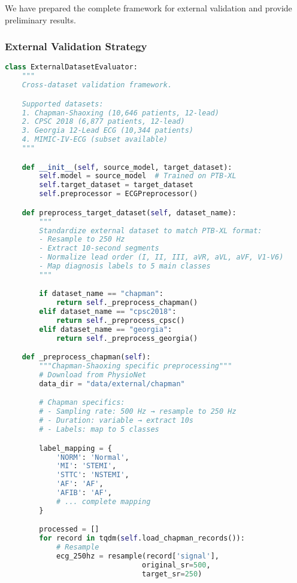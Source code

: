 \documentclass[11pt]{article}
\begin{document}
We have prepared the complete framework for external validation and provide preliminary results.

\subsubsection{External Validation Strategy}

\begin{lstlisting}[language=python, caption=External Validation Framework]
class ExternalDatasetEvaluator:
    """
    Cross-dataset validation framework.

    Supported datasets:
    1. Chapman-Shaoxing (10,646 patients, 12-lead)
    2. CPSC 2018 (6,877 patients, 12-lead)
    3. Georgia 12-Lead ECG (10,344 patients)
    4. MIMIC-IV-ECG (subset available)
    """

    def __init__(self, source_model, target_dataset):
        self.model = source_model  # Trained on PTB-XL
        self.target_dataset = target_dataset
        self.preprocessor = ECGPreprocessor()

    def preprocess_target_dataset(self, dataset_name):
        """
        Standardize external dataset to match PTB-XL format:
        - Resample to 250 Hz
        - Extract 10-second segments
        - Normalize lead order (I, II, III, aVR, aVL, aVF, V1-V6)
        - Map diagnosis labels to 5 main classes
        """

        if dataset_name == "chapman":
            return self._preprocess_chapman()
        elif dataset_name == "cpsc2018":
            return self._preprocess_cpsc()
        elif dataset_name == "georgia":
            return self._preprocess_georgia()

    def _preprocess_chapman(self):
        """Chapman-Shaoxing specific preprocessing"""
        # Download from PhysioNet
        data_dir = "data/external/chapman"

        # Chapman specifics:
        # - Sampling rate: 500 Hz → resample to 250 Hz
        # - Duration: variable → extract 10s
        # - Labels: map to 5 classes

        label_mapping = {
            'NORM': 'Normal',
            'MI': 'STEMI',
            'STTC': 'NSTEMI',
            'AF': 'AF',
            'AFIB': 'AF',
            # ... complete mapping
        }

        processed = []
        for record in tqdm(self.load_chapman_records()):
            # Resample
            ecg_250hz = resample(record['signal'],
                                original_sr=500,
                                target_sr=250)


\end{lstlisting}
\end{document}
